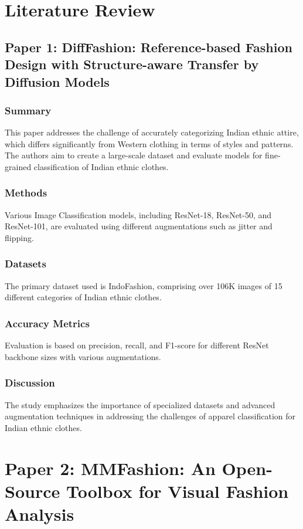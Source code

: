 \documentclass{article}
\begin{document}
\section*{Literature Review}

\subsection*{Paper 1: DiffFashion: Reference-based Fashion Design with Structure-aware Transfer by Diffusion Models }
\subsubsection*{Summary}
This paper addresses the challenge of accurately categorizing Indian ethnic attire, which differs significantly from Western clothing in terms of styles and patterns. The authors aim to create a large-scale dataset and evaluate models for fine-grained classification of Indian ethnic clothes.
\subsubsection*{Methods}
Various Image Classification models, including ResNet-18, ResNet-50, and ResNet-101, are evaluated using different augmentations such as jitter and flipping.
\subsubsection*{Datasets}
The primary dataset used is IndoFashion, comprising over 106K images of 15 different categories of Indian ethnic clothes.
\subsubsection*{Accuracy Metrics}
Evaluation is based on precision, recall, and F1-score for different ResNet backbone sizes with various augmentations.
\subsubsection*{Discussion}
The study emphasizes the importance of specialized datasets and advanced augmentation techniques in addressing the challenges of apparel classification for Indian ethnic clothes.



\section*{Paper 2: MMFashion: An Open-Source Toolbox for Visual Fashion Analysis }
\end{document}
